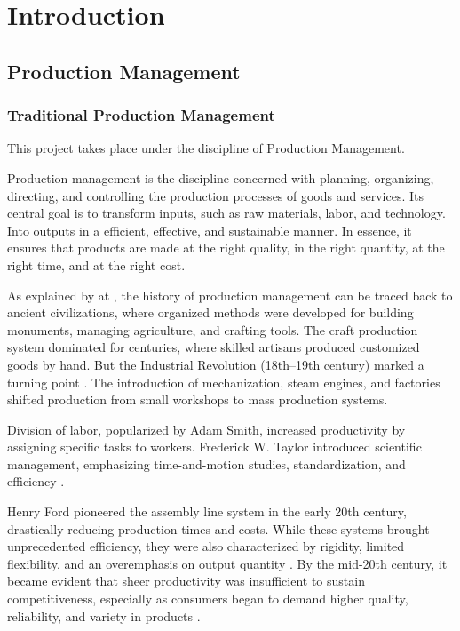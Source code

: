 \documentclass[]{article}
\begin{document}
\clearpage
\newpage
\section{Introduction}\label{Introduction}
\subsection{Production Management}
\subsubsection{Traditional Production Management}

This project takes place under the discipline of Production Management.

Production management is the discipline concerned with planning, organizing, directing, and controlling the production processes of goods and services. Its central goal is to transform inputs, such as raw materials, labor, and technology. Into outputs in a efficient, effective, and sustainable manner. In essence, it ensures that products are made at the right quality, in the right quantity, at the right time, and at the right cost.

As explained by \citeauthor{womack_machine_1991} at  \cite{womack_machine_1991}, the history of production management can be traced back to ancient civilizations, where organized methods were developed for building monuments, managing agriculture, and crafting tools.
The craft production system dominated for centuries, where skilled artisans produced customized goods by hand.
But the Industrial Revolution (18th–19th century) marked a turning point \cite{ohno_toyota_1988}. The introduction of mechanization, steam engines, and factories shifted production from small workshops to mass production systems.

Division of labor, popularized by Adam Smith, increased productivity by assigning specific tasks to workers.
Frederick W. Taylor introduced scientific management, emphasizing time-and-motion studies, standardization, and efficiency \cite{drury_chapter_2019}.

Henry Ford pioneered the assembly line system in the early 20th century, drastically reducing production times and costs.
While these systems brought unprecedented efficiency, they were also characterized by rigidity, limited flexibility, and an overemphasis on output quantity \cite{ohno_toyota_1988}. By the mid-20th century, it became evident that sheer productivity was insufficient to sustain competitiveness, especially as consumers began to demand higher quality, reliability, and variety in products \cite{massaki_gemba_2015}.
\end{document}
